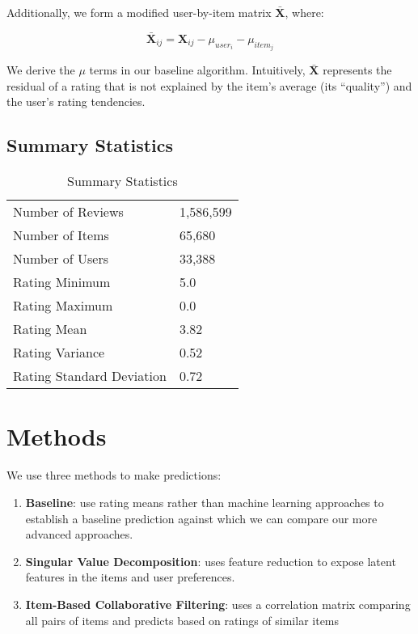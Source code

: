 \documentclass[12pt]{article}
\begin{document}
Additionally, we form a modified user-by-item matrix $\mathbf{\bar X}$, where:

$$ \mathbf{\bar X}_{ij} = \mathbf{X}_{ij} - \mu_{user_i} - \mu_{item_j}$$

We derive the $\mu$ terms in our baseline algorithm. Intuitively, $\mathbf{\bar X}$ represents the residual of a rating that is not explained by the item's average (its ``quality'') and the user's rating tendencies.

\subsection{Summary Statistics}

\begin{table}[ht!]
\centering
\caption{Summary Statistics}
\begin{tabular}{ll}
\hline
Number of Reviews         & 1,586,599 \\
Number of Items           & 65,680    \\
Number of Users           & 33,388    \\
Rating Minimum            & 5.0       \\
Rating Maximum            & 0.0       \\
Rating Mean               & 3.82      \\
Rating Variance           & 0.52      \\
Rating Standard Deviation & 0.72      \\ \hline
\end{tabular}
\end{table}

\section{Methods}
We use three methods to make predictions:

\begin{enumerate}
  \item \textbf{Baseline}: use rating means rather than machine learning approaches to establish a baseline prediction against which we can compare our more advanced approaches.
  \item \textbf{Singular Value Decomposition}: uses feature reduction to expose latent features in the items and user preferences.
  \item \textbf{Item-Based Collaborative Filtering}: uses a correlation matrix comparing all pairs of items and predicts based on ratings of similar items
\end{enumerate}
\end{document}
